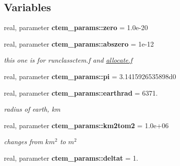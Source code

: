 \subsection*{Variables}
\begin{DoxyCompactItemize}
\item 
\hypertarget{namespacectem__params_af50137d2374a0a75ff9d0f4153da6a54}{}real, parameter {\bfseries ctem\+\_\+params\+::zero} = 1.\+0e-\/20\label{namespacectem__params_af50137d2374a0a75ff9d0f4153da6a54}

\item 
\hypertarget{namespacectem__params_ac207816bca09bac9b87c4e17ba7dfee1}{}real, parameter {\bfseries ctem\+\_\+params\+::abszero} = 1e-\/12\label{namespacectem__params_ac207816bca09bac9b87c4e17ba7dfee1}

\begin{DoxyCompactList}\small\item\em this one is for runclassctem.\+f and \hyperlink{allocate_8f}{allocate.\+f} \end{DoxyCompactList}\item 
\hypertarget{namespacectem__params_add603c0bfb6c468101dbdcc710f98703}{}real, parameter {\bfseries ctem\+\_\+params\+::pi} = 3.\+1415926535898d0\label{namespacectem__params_add603c0bfb6c468101dbdcc710f98703}

\item 
\hypertarget{namespacectem__params_a543d5b22d79302823fd389c0f869c384}{}real, parameter {\bfseries ctem\+\_\+params\+::earthrad} = 6371.\label{namespacectem__params_a543d5b22d79302823fd389c0f869c384}

\begin{DoxyCompactList}\small\item\em radius of earth, km \end{DoxyCompactList}\item 
\hypertarget{namespacectem__params_a7d03b303154efb0e76c58c9c03a55e06}{}real, parameter {\bfseries ctem\+\_\+params\+::km2tom2} = 1.\+0e+06\label{namespacectem__params_a7d03b303154efb0e76c58c9c03a55e06}

\begin{DoxyCompactList}\small\item\em changes from $km^2$ to $m^2$ \end{DoxyCompactList}\item 
\hypertarget{namespacectem__params_a0eda7d3a6fad697a660806095840a1fb}{}real, parameter {\bfseries ctem\+\_\+params\+::deltat} = 1.\label{namespacectem__params_a0eda7d3a6fad697a660806095840a1fb}


\end{DoxyCompactItemize}
